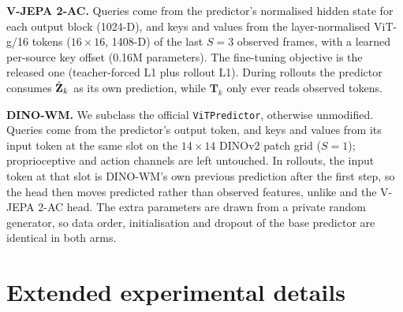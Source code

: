 \textbf{V-JEPA 2-AC.} Queries come from the predictor's normalised hidden state for each output block (1024-D), and
keys and values from the layer-normalised ViT-g/16 tokens ($16{\times}16$, 1408-D) of the last $S{=}3$ observed frames,
with a learned per-source key offset (0.16M parameters).
%
The fine-tuning objective is the released one (teacher-forced L1 plus rollout L1).
%
During rollouts the predictor consumes $\hat{\mathbf{Z}}_k$ as its own prediction, while $\mathbf{T}_k$ only ever reads observed
tokens.

\textbf{DINO-WM.} We subclass the official \texttt{ViTPredictor}, otherwise unmodified.
%
Queries come from the predictor's output token, and keys and values from its input token at the same slot on the
$14{\times}14$ DINOv2 patch grid ($S{=}1$); proprioceptive and action channels are left untouched.
%
In rollouts, the input token at that slot is DINO-WM's own previous prediction after the first step, so the head then
moves predicted rather than observed features, unlike \ours{} and the V-JEPA 2-AC head.
%
The extra parameters are drawn from a private random generator, so data order, initialisation and dropout of the base
predictor are identical in both arms.



\FloatBarrier
\section{Extended experimental details}\label{app:exp}
